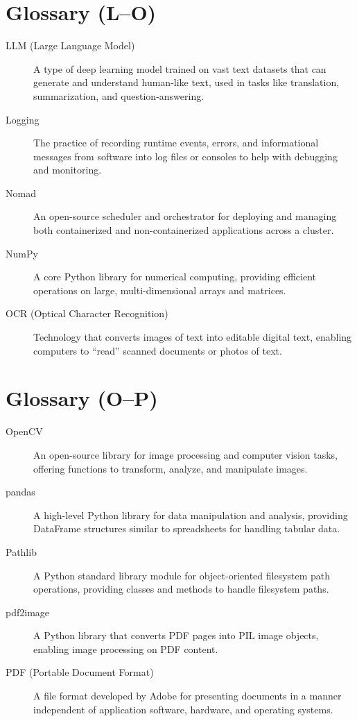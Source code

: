 \section*{Glossary (L–O)}
\begin{description}
  \item[LLM (Large Language Model)] 
    A type of deep learning model trained on vast text datasets that can generate 
    and understand human-like text, used in tasks like translation, summarization, and question-answering.
  \item[Logging] 
    The practice of recording runtime events, errors, and informational messages 
    from software into log files or consoles to help with debugging and monitoring.
  \item[Nomad] 
    An open-source scheduler and orchestrator for deploying and managing both containerized and non-containerized applications across a cluster.
  \item[NumPy] 
    A core Python library for numerical computing, providing efficient operations on 
    large, multi-dimensional arrays and matrices.
  \item[OCR (Optical Character Recognition)] 
    Technology that converts images of text into editable digital text, enabling  
    computers to “read” scanned documents or photos of text.
\end{description}
\section*{Glossary (O–P)}
\begin{description}
  \item[OpenCV] 
    An open-source library for image processing and computer vision tasks, offering 
    functions to transform, analyze, and manipulate images.
  \item[pandas] 
    A high-level Python library for data manipulation and analysis, providing DataFrame 
    structures similar to spreadsheets for handling tabular data.
  \item[Pathlib] 
    A Python standard library module for object-oriented filesystem path operations, 
    providing classes and methods to handle filesystem paths.
  \item[pdf2image] 
    A Python library that converts PDF pages into PIL image objects, enabling image 
    processing on PDF content.
  \item[PDF (Portable Document Format)] 
    A file format developed by Adobe for presenting documents in a manner independent 
    of application software, hardware, and operating systems.
\end{description}
